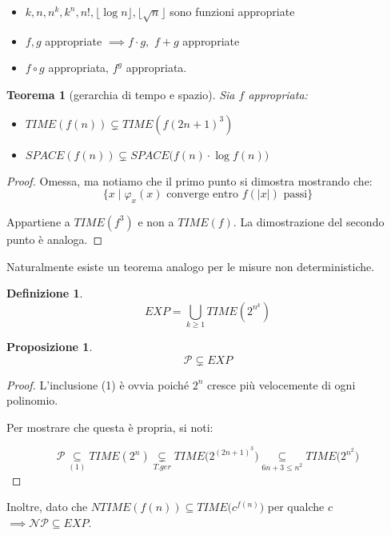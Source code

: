 \documentclass[a4paper,10pt,oneside]{article}
\theoremstyle{break}
\newtheorem{deff}{Definizione}[section]
\newtheorem{prop}{Proposizione}[subsection]
\newtheorem{teo}{Teorema}[subsection]
\begin{document}
 \begin{itemize}
  \item $k, n, n^k, k^n, n!, \lfloor\log n \rfloor, \lfloor\sqrt n\rfloor$ sono funzioni appropriate
  \item $f, g$ appropriate $ \implies f \cdot g,\,\, f + g$ appropriate
  \item $f \circ g$ appropriata, $f^g$ appropriata.
 \end{itemize}

 \begin{mdframed}
  \begin{teo}[gerarchia di tempo e spazio]
   Sia $f$ appropriata:
   \begin{itemize}
    \item $TIME(f(n)) \subsetneq TIME(f(2n + 1)^3)$
    \item $SPACE(f(n)) \subsetneq SPACE\big(f(n) \cdot \log f(n)\big)$
   \end{itemize}
  \end{teo}

  \dotfill

  \begin{proof}
   Omessa, ma notiamo che il primo punto si dimostra mostrando che:
   \[ \{ x \mid \varphi_x(x) \text{ converge entro } f(|x|) \text{ passi} \} \]

   Appartiene a $TIME(f^3)$ e non a $TIME(f)$. La dimostrazione del secondo punto è analoga.
   \end{proof}
 \end{mdframed}

 Naturalmente esiste un teorema analogo per le misure non deterministiche.
\newpage


 \begin{deff}
  \[ EXP = \bigcup_{k \geq 1} TIME (2^{n^k}) \]
 \end{deff}

 \begin{mdframed}
 \begin{prop}
  \[ \mathcal P \subsetneq EXP\]
 \end{prop}

 \dotfill

 \begin{proof}
  L'inclusione (1) è ovvia poiché $2^n$ cresce più velocemente di ogni polinomio.\smallskip

  Per mostrare che questa è propria, si noti:

  \[ \mathcal P \underset{(1)}\subseteq TIME (2^n) \underset{T.ger}\subsetneq TIME \Big(2^{(2n + 1)^3}\Big) \underset{6n + 3 \leq n^2} \subseteq TIME\Big(2^{n^2}\Big) \]
 \end{proof}

 \dotfill\smallskip

 Inoltre, dato che $NTIME (f(n)) \subseteq TIME\Big(c^{f(n)}\Big)$ per qualche $c$ $\implies \mathcal{NP} \subseteq EXP $. 

 \end{mdframed}
\end{document}
